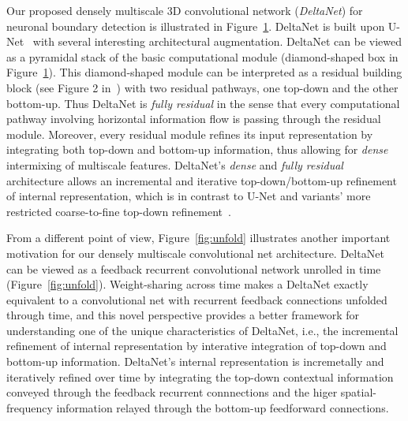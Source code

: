 \documentclass{article}
\begin{document}
\begin{appendices}
\begin{figure}[!b]
\label{fig:boundary_detector}
\end{figure}

Our proposed densely multiscale 3D convolutional network (\emph{DeltaNet}) for
neuronal boundary detection is illustrated in
Figure~\ref{fig:boundary_detector}. DeltaNet is built upon U-Net~\cite{unet}
with several interesting architectural augmentation. DeltaNet can be viewed as a
pyramidal stack of the basic computational module (diamond-shaped box in
Figure~\ref{fig:boundary_detector}). This diamond-shaped module can be
interpreted as a residual building block (see Figure 2 in~\cite{resnet}) with
two residual pathways, one top-down and the other bottom-up. Thus DeltaNet is
\emph{fully residual} in the sense that every computational pathway involving
horizontal information flow is passing through the residual module. Moreover,
every residual module refines its input representation by integrating both
top-down and bottom-up information, thus allowing for \emph{dense} intermixing
of multiscale features. DeltaNet's \emph{dense} and \emph{fully residual}
architecture allows an incremental and iterative top-down/bottom-up refinement
of internal representation, which is in contrast to U-Net and variants' more
restricted coarse-to-fine top-down
refinement~\cite{pinheiro2016refine,lin2016pyramid}.

From a different point of view, Figure~\ref{fig:unfold} illustrates another
important motivation for our densely multiscale convolutional net architecture.
DeltaNet can be viewed as a feedback recurrent convolutional network unrolled in
time (Figure~\ref{fig:unfold}). Weight-sharing across time makes a DeltaNet
exactly equivalent to a convolutional net with recurrent feedback connections
unfolded through time, and this novel perspective provides a better framework
for understanding one of the unique characteristics of DeltaNet, i.e., the
incremental refinement of internal representation by interative integration of
top-down and bottom-up information. DeltaNet's internal representation is
incremetally and iteratively refined over time by integrating the top-down
contextual information conveyed through the feedback recurrent connnections and
the higer spatial-frequency information relayed through the bottom-up
feedforward connections.


\end{appendices}
\end{document}
